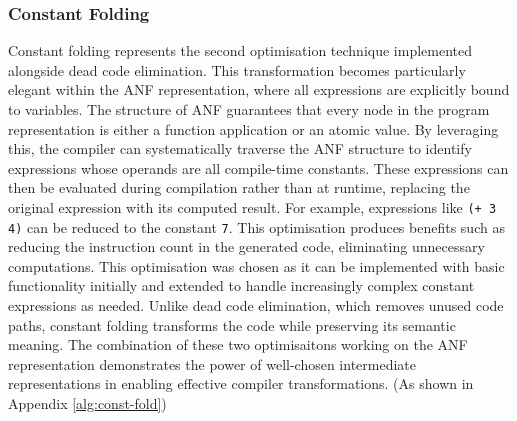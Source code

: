 \documentclass[final]{cmpreport_02}
\begin{document}
\subsubsection{Constant Folding}
Constant folding represents the second optimisation technique implemented alongside dead code elimination. This transformation becomes particularly elegant within the ANF representation, where all expressions are explicitly bound to variables. The structure of ANF guarantees that every node in the program representation is either a function application or an atomic value.
By leveraging this, the compiler can systematically traverse the ANF structure to identify expressions whose operands are all compile-time constants. These expressions can then be evaluated during compilation rather than at runtime, replacing the original expression with its computed result. For example, expressions like \texttt{(+ 3 4)} can be reduced to the constant \texttt{7}.
This optimisation produces benefits such as reducing the instruction count in the generated code, eliminating unnecessary computations. This optimisation was chosen as it can be implemented with basic functionality initially and extended to handle increasingly complex constant expressions as needed.
Unlike dead code elimination, which removes unused code paths, constant folding transforms the code while preserving its semantic meaning. The combination of these two optimisaitons working on the ANF representation demonstrates the power of well-chosen intermediate representations in enabling effective compiler transformations.
(As shown in Appendix \ref{alg:const-fold})
\end{document}
